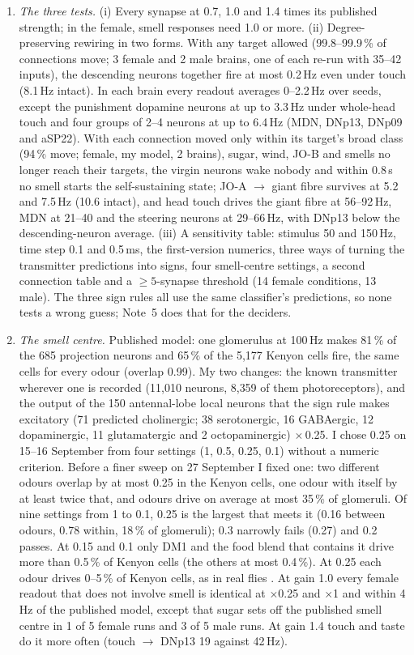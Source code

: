 \documentclass[11pt,a4paper]{article}
\begin{document}
\begin{enumerate}[leftmargin=*, label=\arabic*., itemsep=4pt]
\item \emph{The three tests.} (i) Every synapse at 0.7, 1.0 and 1.4 times its published strength; in the female, smell responses need 1.0 or more. (ii) Degree-preserving rewiring \citep{maslov2002specificity} in two forms. With any target allowed (99.8--99.9\,\% of connections move; 3 female and 2 male brains, one of each re-run with 35--42 inputs), the descending neurons together fire at most 0.2\,Hz even under touch (8.1\,Hz intact). In each brain every readout averages 0--2.2\,Hz over seeds, except the punishment dopamine neurons at up to 3.3\,Hz under whole-head touch and four groups of 2--4 neurons at up to 6.4\,Hz (MDN, DNp13, DNp09 and aSP22). With each connection moved only within its target's broad class (94\,\% move; female, my model, 2 brains), sugar, wind, JO-B and smells no longer reach their targets, the virgin neurons wake nobody and within 0.8\,s no smell starts the self-sustaining state; JO-A $\rightarrow$ giant fibre survives at 5.2 and 7.5\,Hz (10.6 intact), and head touch drives the giant fibre at 56--92\,Hz, MDN at 21--40 and the steering neurons at 29--66\,Hz, with DNp13 below the descending-neuron average. (iii) A sensitivity table: stimulus 50 and 150\,Hz, time step 0.1 and 0.5\,ms, the first-version numerics, three ways of turning the transmitter predictions into signs, four smell-centre settings, a second connection table and a $\geq 5$-synapse threshold (14 female conditions, 13 male). The three sign rules all use the same classifier's predictions, so none tests a wrong guess; Note~5 does that for the deciders.

\item \emph{The smell centre.} Published model: one glomerulus at 100\,Hz makes 81\,\% of the 685 projection neurons and 65\,\% of the 5{,}177 Kenyon cells fire, the same cells for every odour (overlap 0.99). My two changes: the known transmitter wherever one is recorded (11{,}010 neurons, 8{,}359 of them photoreceptors), and the output of the 150 antennal-lobe local neurons that the sign rule makes excitatory (71 predicted cholinergic; 38 serotonergic, 16 GABAergic, 12 dopaminergic, 11 glutamatergic and 2 octopaminergic) $\times$\,0.25. I chose 0.25 on 15--16 September from four settings (1, 0.5, 0.25, 0.1) without a numeric criterion. Before a finer sweep on 27 September I fixed one: two different odours overlap by at most 0.25 in the Kenyon cells, one odour with itself by at least twice that, and odours drive on average at most 35\,\% of glomeruli. Of nine settings from 1 to 0.1, 0.25 is the largest that meets it (0.16 between odours, 0.78 within, 18\,\% of glomeruli); 0.3 narrowly fails (0.27) and 0.2 passes. At 0.15 and 0.1 only DM1 and the food blend that contains it drive more than 0.5\,\% of Kenyon cells (the others at most 0.4\,\%). At 0.25 each odour drives 0--5\,\% of Kenyon cells, as in real flies \citep{honegger2011cellular}. At gain 1.0 every female readout that does not involve smell is identical at $\times$0.25 and $\times$1 and within 4\,Hz of the published model, except that sugar sets off the published smell centre in 1 of 5 female runs and 3 of 5 male runs. At gain 1.4 touch and taste do it more often (touch $\rightarrow$ DNp13 19 against 42\,Hz).


\end{enumerate}
\end{document}
